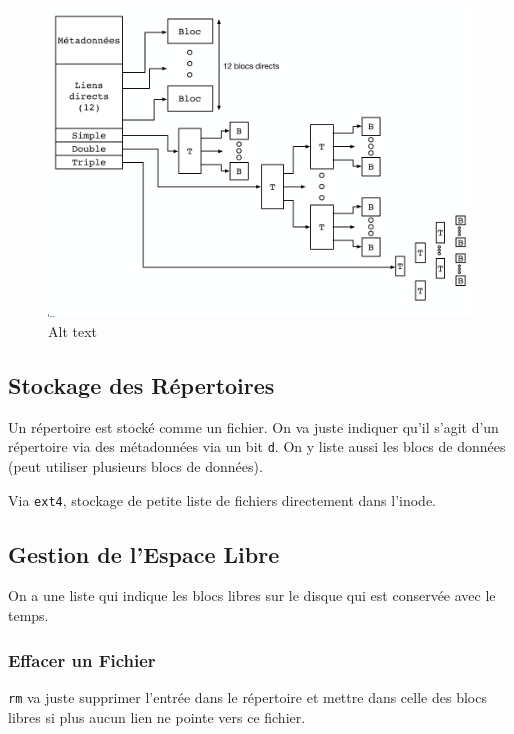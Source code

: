 \begin{figure}
\centering
\includegraphics{image-45.png}
\caption{Alt text}
\end{figure}

\subsection{Stockage des Répertoires}\label{stockage-des-ruxe9pertoires}

Un répertoire est stocké comme un fichier. On va juste indiquer qu'il
s'agit d'un répertoire via des métadonnées via un bit \texttt{d}. On y
liste aussi les blocs de données (peut utiliser plusieurs blocs de
données).

Via \texttt{ext4}, stockage de petite liste de fichiers directement dans
l'inode.

\subsection{Gestion de l'Espace Libre}\label{gestion-de-lespace-libre}

On a une liste qui indique les blocs libres sur le disque qui est
conservée avec le temps.

\subsubsection{Effacer un Fichier}\label{effacer-un-fichier}

\texttt{rm} va juste supprimer l'entrée dans le répertoire et mettre
dans celle des blocs libres si plus aucun lien ne pointe vers ce
fichier.

